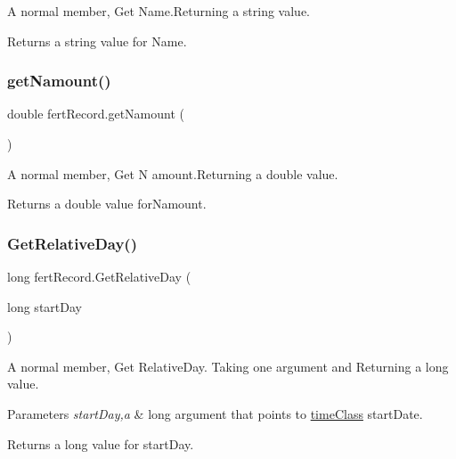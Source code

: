 A normal member, Get Name.\+Returning a string value. 

\begin{DoxyReturn}{Returns}
a string value for Name. 
\end{DoxyReturn}
\mbox{\label{classfert_record_a6bc947989cbf5d092b1428af9870205e}} 
\subsubsection{\texorpdfstring{getNamount()}{getNamount()}}
{\footnotesize\ttfamily double fert\+Record.\+get\+Namount (\begin{DoxyParamCaption}{ }\end{DoxyParamCaption})\hspace{0.3cm}{\ttfamily [inline]}}



A normal member, Get N amount.\+Returning a double value. 

\begin{DoxyReturn}{Returns}
a double value for\+Namount. 
\end{DoxyReturn}
\mbox{\label{classfert_record_a54e59e6321610b1d3f5b323932f2347a}} 
\subsubsection{\texorpdfstring{GetRelativeDay()}{GetRelativeDay()}}
{\footnotesize\ttfamily long fert\+Record.\+Get\+Relative\+Day (\begin{DoxyParamCaption}\item[{long}]{start\+Day }\end{DoxyParamCaption})\hspace{0.3cm}{\ttfamily [inline]}}



A normal member, Get Relative\+Day. Taking one argument and Returning a long value. 


\begin{DoxyParams}{Parameters}
{\em start\+Day,a} & long argument that points to \mbox{\hyperlink{classtime_class}{time\+Class}} start\+Date. \\
\hline
\end{DoxyParams}
\begin{DoxyReturn}{Returns}
a long value for start\+Day. 
\end{DoxyReturn}
\mbox{\label{classfert_record_a50f47d7b4c2dc0d6349e34b1acb4ffad}} 
